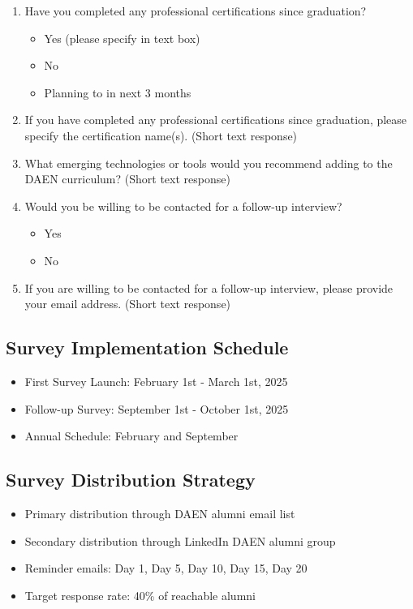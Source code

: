 \documentclass[12pt,a4paper]{article}
\begin{document}
\begin{enumerate}
\item Have you completed any professional certifications since graduation?
\begin{itemize}
    \item Yes (please specify in text box)
    \item No
    \item Planning to in next 3 months
\end{itemize}

\item If you have completed any professional certifications since graduation, please specify the certification name(s). (Short text response)

\item What emerging technologies or tools would you recommend adding to the DAEN curriculum? (Short text response)

\item Would you be willing to be contacted for a follow-up interview?
\begin{itemize}
    \item Yes
    \item No
\end{itemize}

\item If you are willing to be contacted for a follow-up interview, please provide your email address. (Short text response)
\end{enumerate}

\subsection{Survey Implementation Schedule}
\begin{itemize}
    \item First Survey Launch: February 1st - March 1st, 2025
    \item Follow-up Survey: September 1st - October 1st, 2025
    \item Annual Schedule: February and September
\end{itemize}

\subsection{Survey Distribution Strategy}
\begin{itemize}
    \item Primary distribution through DAEN alumni email list
    \item Secondary distribution through LinkedIn DAEN alumni group
    \item Reminder emails: Day 1, Day 5, Day 10, Day 15, Day 20
    \item Target response rate: 40\% of reachable alumni
\end{itemize}
\end{document}
